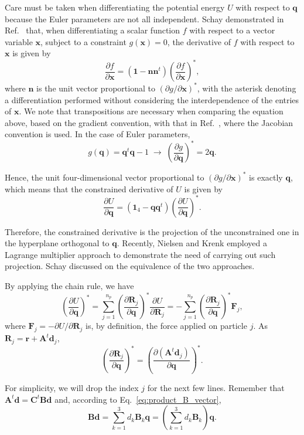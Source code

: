 \documentclass[aip,jcp,reprint,amsmath,amssymb,amsfont]{revtex4-1}
\newcommand{\mt}[1]{\boldsymbol{\mathbf{#1}}}           %
\newcommand{\vt}[1]{\boldsymbol{\mathbf{#1}}}           %
\newcommand{\tr}[1]{#1^t}                               %
\newcommand{\diff}[2]{\dfrac{\partial #1}{\partial #2}} %
\begin{document}
Care must be taken when differentiating the potential energy $U$ with respect to $\vt q$ because the Euler parameters are not all independent. Schay demonstrated in Ref.~\cite{Schay1995} that, when differentiating a scalar function $f$ with respect to a vector variable $\vt x$, subject to a constraint $g(\vt x) = 0$, the derivative of $f$ with respect to $\vt x$ is given by
\[
\diff{f}{\vt x} = (\vt 1 - \vt n \tr{\vt n})\left( \diff{f}{\vt x} \right)^\ast,
\]
where $\vt n$ is the unit vector proportional to $(\partial g/\partial \vt x)^\ast$, with the asterisk denoting a differentiation performed without considering the interdependence of the entries of $\vt x$. We note that transpositions are necessary when comparing the equation above, based on the gradient convention, with that in Ref.~\cite{Schay1995}, where the Jacobian convention is used. In the  case of Euler parameters,
\[
g(\vt q) = \tr{\vt q}\vt q - 1 \; \rightarrow \; \left(\diff{g}{\vt q}\right)^\ast = 2 \vt q.
\]

Hence, the unit four-dimensional vector proportional to $(\partial g/\partial \vt x)^\ast$ is exactly $\vt q$, which means that the constrained derivative of $U$ is given by
\begin{equation}
\label{eq:diff_projection}
\diff{U}{\vt q} = (\mt 1_4 - {\vt q}\tr{\vt q})\left( \diff{U}{\vt q} \right)^\ast.
\end{equation}

Therefore, the constrained derivative is the projection of the unconstrained one in the hyperplane orthogonal to $\vt q$. Recently, Nielsen and Krenk\cite{Nielsen2012} employed a Lagrange multiplier approach to demonstrate the need of carrying out such projection. Schay\cite{Schay1995, Schay1998} discussed on the equivalence of the two approaches.

By applying the chain rule, we have
\[
\left( \diff{U}{\vt q} \right)^\ast = \sum_{j=1}^{n_p} \left( \diff{\vt R_j}{\vt q} \right)^\ast \diff{U}{\vt R_j} = - \sum_{j=1}^{n_p} \left( \diff{\vt R_j}{\vt q} \right)^\ast {\vt F_j},
\]
where $\vt F_j = -\partial U/\partial \vt R_j$ is, by definition, the force applied on particle $j$. As $\vt R_j = \vt r + \tr{\mt A}\vt d_j$,
\[
\left( \diff{\vt R_j}{\vt q} \right)^\ast = \left( \diff{(\tr{\mt A}\vt d_j)}{\vt q} \right)^\ast.
\]

For simplicity, we will drop the index $j$ for the next few lines. Remember that $\tr{\mt A}\vt d = \tr{\mt C} \mt B\vt d$ and, according to Eq.~\ref{eq:product_B_vector},
\[
\mt B \vt d = \sum_{k=1}^3 d_k \mt B_k \vt q = \left( \sum_{k=1}^3 d_k \mt B_k \right) \vt q.
\]
\end{document}

